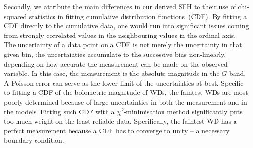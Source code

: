 \documentclass[fleqn,usenatbib]{mnras}
\begin{document}
Secondly, we attribute the main differences in our derived SFH to their
use of chi-squared statistics in fitting cumulative distribution
functions~(CDF). By fitting a CDF directly to the cumulative data, one would
run into significant issues coming from strongly correlated values in the
neighbouring values in the ordinal axis. The uncertainty of a data point on
a CDF is not merely the uncertainty in that given bin, the uncertainties
accumulate to the successive bins non-linearly, depending on how accurate the
measurement can be made on the observed variable. In this case, the measurement
is the absolute magnitude in the $G$ band. A Poisson error can serve as the
lower limit of the uncertainties at best. Specific to fitting a CDF of the
bolometric magnitude of WDs, the faintest WDs are most poorly determined because
of large uncertainties in both the measurement and in the models. Fitting such
CDF with a $\chi^2$-minimisation method significantly puts too much weight on
the least reliable data. Specifically, the faintest WD has a perfect measurement
because a CDF has to converge to unity -- a necessary boundary condition.
\end{document}
